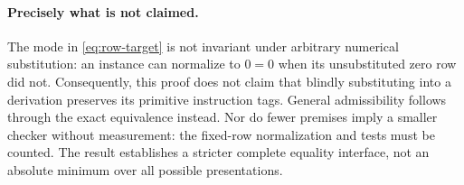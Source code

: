 \paragraph{Precisely what is not claimed.}
The mode in \eqref{eq:row-target} is not invariant under arbitrary
numerical substitution: an instance can normalize to $0=0$ when its
unsubstituted zero row did not.  Consequently, this proof does not claim
that blindly substituting into a derivation preserves its primitive
instruction tags.  General admissibility follows through the exact
equivalence instead.  Nor do fewer premises imply a smaller checker
without measurement: the fixed-row normalization and tests must be
counted.  The result establishes a stricter complete equality interface,
not an absolute minimum over all possible presentations.

